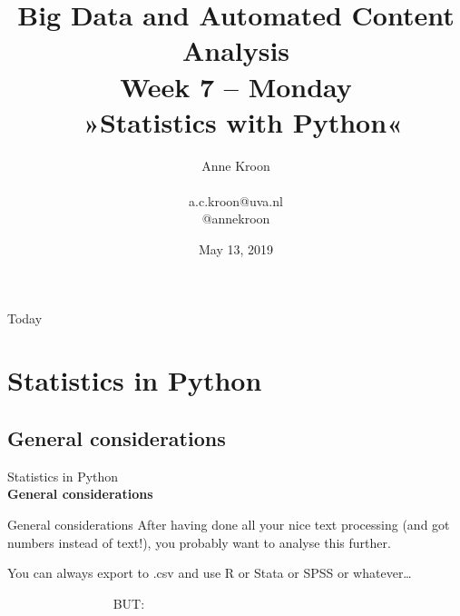 \documentclass[handout]{beamer}
\begin{document}
\title[Big Data and Automated Content Analysis]{\textbf{Big Data and Automated Content Analysis} \\ Week 7 -- Monday \\ \ »Statistics with Python«}
\author[Anne Kroon]{Anne Kroon \\ ~ \\ \footnotesize{a.c.kroon@uva.nl \\@annekroon} \\}
\date{May 13, 2019}


\begin{frame}
\titlepage
\end{frame}

\begin{frame}{Today}
\tableofcontents
\end{frame}



\section{Statistics in Python}
\subsection{General considerations}

\begin{frame}[plain]
Statistics in Python\\
\textbf{General considerations}
\end{frame}

\begin{frame}{General considerations}
After having done all your nice text processing (and got numbers instead of text!), you probably want to analyse this further.

You can always export to .csv and use R or Stata or SPSS or whatever\ldots

\vspace{1cm}
\pause

~~~~~~~~~~~~~~~~ \Huge{BUT:}
\end{frame}
\end{document}
